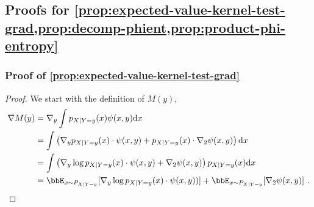\documentclass[11pt]{article}
\newcounter{ct}
\newcommand{\rmd}{\mathrm{d}}
\begin{document}
\subsection{Proofs for \cref{prop:expected-value-kernel-test-grad,prop:decomp-phient,prop:product-phi-entropy}}
\label{sec:proofs-prop-proofs}

\subsubsection{Proof of \cref{prop:expected-value-kernel-test-grad}}
\begin{proof}
We start with the definition of \(M(y)\),
\begin{align*}
    \nabla M(y) &= \nabla_{y} \int p_{X | Y = y}(x) \psi(x, y) \rmd x \\
    &= \int \left(\nabla_{y} p_{X | Y = y}(x) \cdot \psi(x, y) + p_{X | Y = y}(x) \cdot \nabla_{2}\psi(x, y) \right)\rmd x \\
    &= \int \left(\nabla_{y} \log p_{X | Y = y}(x) \cdot \psi(x, y) + \nabla_{2}\psi(x, y)\right) p_{X | Y = y}(x) \rmd x \\
    &= \bbE_{x \sim P_{X | Y =y}}[\nabla_{y}\log p_{X | Y = y}(x) \cdot \psi(x, y))] + \bbE_{x \sim P_{X | Y =y}}[\nabla_{2}\psi(x, y)]~.
\end{align*}
\end{proof}
\end{document}
